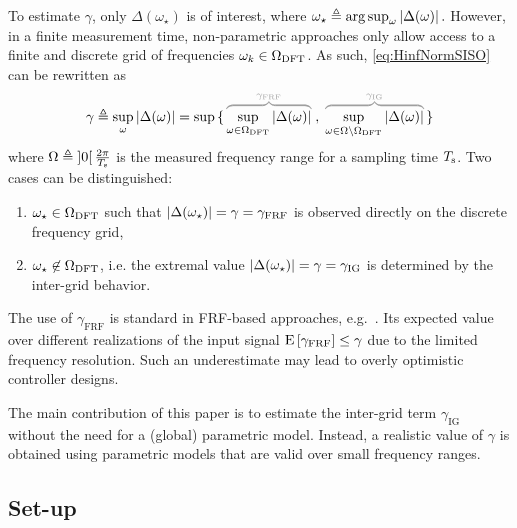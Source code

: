 To estimate $\gamma$, only $\Delta(\omega_{\star})$ is of interest, where
$ \omega_{\star} 
     \triangleq 
       \arg
         \sup_{\omega} 
           \left| \Delta(\omega) \right|
  \text{.}
  \label{eq:omega-star}
$
However, in a finite measurement time, non-parametric approaches only allow access to a finite and discrete grid of frequencies $\omega_k \in \Omega_{\mathrm{DFT}}$.
As such, \eqref{eq:HinfNormSISO} can be rewritten as
\begin{equation}
  \gamma \isdef \sup_{\omega} \abs{\Delta(\omega)}
         = \sup 
             \set{
                \ezbrace{\sup_{\omega \in \DFTGrid  } \abs{\Delta(\omega)}}{\gamma_{\mathrm{FRF}}}
                \;,\;
                \ezbrace{
                \sup_{\omega \in \InterGrid} \abs{\Delta(\omega)}}{\gamma_{\mathrm{IG}}}}
  \label{eq:gamma-split-grid}
\end{equation}
where $\Omega \triangleq \left] 0 \right[{\frac{2\pi}{T_{\mathrm{s}}}}$ is the measured frequency range for a sampling time $T_{\mathrm{s}}$.
Two cases can be distinguished:
\begin{enumerate}
  \item $\omega_{\star} \in \Omega_{\mathrm{DFT}}$ such that $\left| \Delta(\omega_{\star}) \right| = \gamma =\gamma_{\mathrm{FRF}}$ is observed directly on the discrete frequency grid,
  \item $\omega_{\star} \not\in \Omega_{\mathrm{DFT}}$, i.e. the extremal value $\left| \Delta(\omega_{\star}) \right|  = \gamma = \gamma_{\mathrm{IG}}$ is determined by the inter-grid behavior.
\end{enumerate}
The use of $\gamma_{\mathrm{FRF}}$ is standard in \gls{FRF}-based approaches, e.g.~\citep{vandeWal2002}.
Its expected value over different realizations of the input signal $\operatorname{E}\left[\gamma_{\mathrm{FRF}}\right] \leq \gamma$ due to the limited frequency resolution.
Such an underestimate may lead to overly optimistic controller designs.

The main contribution of this paper is to  estimate the inter-grid term $\gamma_{\mathrm{IG}}$ without the need for a (global) parametric model.
Instead, a  realistic value of $\gamma$ is obtained using parametric models that are valid over small frequency ranges.

\subsection{Set-up}


